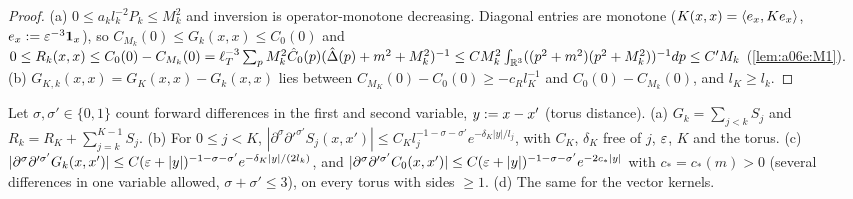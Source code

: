 \begin{proof}
(a) $0\le a_kl_k^{-2}P_k\le M_k^2$ and inversion is operator-monotone decreasing. Diagonal entries are monotone ($K(x,x)=\langle e_x,Ke_x\rangle$, $e_x:=\varepsilon^{-3}\mathbf 1_x$), so $C_{M_k}(0)\le G_k(x,x)\le C_0(0)$ and $0\le R_k(x,x)\le C_0(0)-C_{M_k}(0)=\ell_T^{-3}\sum_pM_k^2\hat C_0(p)(\hat\Delta(p)+m^2+M_k^2)^{-1}\le CM_k^2\int_{\mathbb R^3}((p^2+m^2)(p^2+M_k^2))^{-1}dp\le C'M_k$ (\cref{lem:a06e:M1}). (b) $G_{K,k}(x,x)=G_K(x,x)-G_k(x,x)$ lies between $C_{M_K}(0)-C_0(0)\ge-c_Rl_K^{-1}$ and $C_0(0)-C_{M_k}(0)$, and $l_K\ge l_k$.
\end{proof}

\begin{lemma}\label{lem:a06e:SL}
Let $\sigma,\sigma'\in\{0,1\}$ count forward differences in the first and second variable, $y:= x-x'$ (torus distance). \textup{(a)} $G_k=\sum_{j<k}S_j$ and $R_k=R_K+\sum_{j=k}^{K-1}S_j$. \textup{(b)} For $0\le j<K$, $|\partial^\sigma\partial'^{\sigma'}S_j(x,x')|\le C_Kl_j^{-1-\sigma-\sigma'}e^{-\delta_K|y|/l_j}$, with $C_K$, $\delta_K$ free of $j$, $\varepsilon$, $K$ and the torus. \textup{(c)} $|\partial^\sigma\partial'^{\sigma'}G_k(x,x')|\le C(\varepsilon+|y|)^{-1-\sigma-\sigma'}e^{-\delta_K|y|/(2l_k)}$, and $|\partial^\sigma\partial'^{\sigma'}C_0(x,x')|\le C(\varepsilon+|y|)^{-1-\sigma-\sigma'}e^{-2c_*|y|}$ with $c_*=c_*(m)>0$ (several differences in one variable allowed, $\sigma+\sigma'\le3$), on every torus with sides $\ge1$. \textup{(d)} The same for the vector kernels.
\end{lemma}

